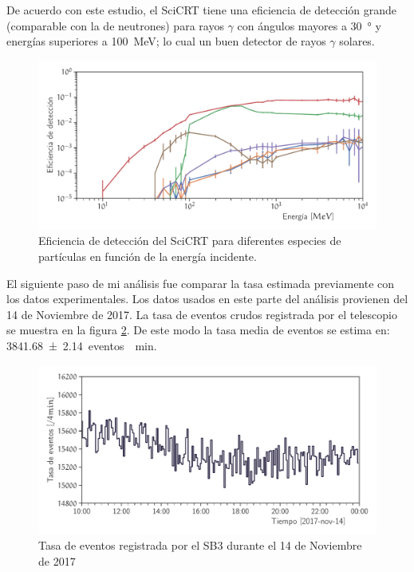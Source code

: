 De acuerdo con este estudio, el SciCRT tiene una eficiencia de detección grande (comparable con la de neutrones) para rayos $\gamma$ con ángulos mayores a \SI{30}{\degree} y energías superiores a \SI{100}{\mega\electronvolt}; lo cual un buen detector de rayos $\gamma$ solares.

\begin{figure}
        \centering
        \includegraphics[width=\textwidth]{scibar-efficiency.pdf}
        \caption{Eficiencia de detección del SciCRT para diferentes especies de partículas en función de la energía incidente.}
        \label{fig:total-efficiency}
\end{figure}

El siguiente paso de mi análisis fue comparar la tasa estimada previamente con los datos experimentales. Los datos usados en este parte del análisis provienen del \num{14} de Noviembre de \num{2017}. La tasa de eventos crudos registrada por el telescopio se muestra en la figura \ref{fig:neutron-1pix}. De este modo la tasa media de eventos se estima en: \SI{3841.68(214)}{eventos \per\minute}.

\begin{figure}
        \centering
        \includegraphics[width=\textwidth]{neutron-171114-1pix.pdf}
        \caption{Tasa de eventos registrada por el SB3 durante el \num{14} de Noviembre de \num{2017}}
        \label{fig:neutron-1pix}
\end{figure}

